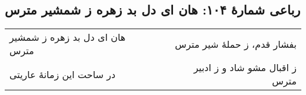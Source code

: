 \begin{center}
\section*{رباعی شمارهٔ ۱۰۴: هان ای دل بد زهره ز شمشیر مترس}
\label{sec:104}
\begin{longtable}{l p{0.5cm} r}
هان ای دل بد زهره ز شمشیر مترس
&&
بفشار قدم، ز حملهٔ شیر مترس
\\
در ساحت این زمانهٔ عاریتی
&&
ز اقبال مشو شاد و ز ادبیر مترس
\\
\end{longtable}
\end{center}
